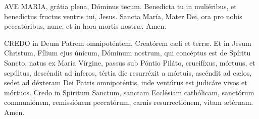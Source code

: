 \begin{multicols}{2}
{{\vfill{}

AVE MARIA, grátia plena, Dóminus tecum. Benedícta tu in muliéribus, et benedíctus fructus ventris tui, Jesus. Sancta María, Mater Dei, ora pro nobis peccatóribus, nunc, et in hora mortis nostræ. Amen.

\vfill{}

CREDO in Deum Patrem omni\-po\-tén\-tem, Creatórem cæli et terræ. Et in Jesum Christum, Fílium ejus únicum, Dóminum nostrum, qui concéptus est de Spíritu Sancto, natus ex María Vírgine, passus sub Póntio Piláto, crucifíxus, mórtuus, et sepúltus, descéndit ad ínferos, tértia die resurréxit a mórtuis, ascéndit ad cælos, sedet ad déxteram Dei Patris omnipoténtis, inde ventúrus est judicáre vivos et mórtuos. Credo in Spíritum Sanctum, sanctam Ecclésiam cathólicam, sanctórum communiónem, remissiónem peccatórum, carnis resurrectiónem, vitam ætérnam. Amen.
}
}
\end{multicols}

